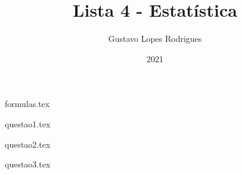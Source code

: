 \documentclass[12pt]{article}
\title{\textbf{Lista 4 - Estatística}}
\author{Gustavo Lopes Rodrigues}
\date{2021}
\begin{document}
    
    \maketitle

    {formulas.tex}

    \newpage

    {questao1.tex}

    \newpage

    {questao2.tex}

    \newpage

    {questao3.tex}
\end{document}
